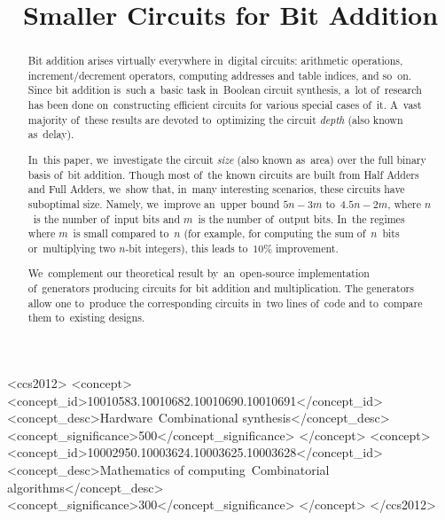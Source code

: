 \documentclass[sigconf, review, anonymous]{acmart}
\begin{document}
\begin{CCSXML}
	<ccs2012>
	<concept>
	<concept_id>10010583.10010682.10010690.10010691</concept_id>
	<concept_desc>Hardware~Combinational synthesis</concept_desc>
	<concept_significance>500</concept_significance>
	</concept>
	<concept>
	<concept_id>10002950.10003624.10003625.10003628</concept_id>
	<concept_desc>Mathematics of computing~Combinatorial algorithms</concept_desc>
	<concept_significance>300</concept_significance>
	</concept>
	</ccs2012>
\end{CCSXML}



\title{Smaller Circuits for Bit Addition}

\begin{abstract}
    Bit addition arises virtually everywhere in~digital circuits:
    arithmetic operations,
    increment/decrement operators,
    computing addresses and table indices, and so~on.
    Since bit addition is~such a~basic task in~Boolean circuit synthesis,
    a~lot of~research has been done on~constructing efficient circuits
    for various special cases of~it. A~vast majority of~these results are devoted to~optimizing the circuit \emph{depth} (also known as~delay).

    In~this paper, we~investigate the circuit \emph{size} (also known as~area)
    over the full binary basis of~bit addition. Though most of~the known circuits are built from Half Adders and Full Adders,
    we~show that, in~many interesting scenarios, these circuits have suboptimal size.
    Namely, we~improve an~upper bound $5n-3m$ to~$4.5n-2m$,
    where $n$~is the number of~input bits and $m$~is the number of~output bits.
    In~the regimes where $m$~is small compared to~$n$ 
    (for example, for computing the sum 
    of~$n$~bits or~multiplying two $n$-bit integers),
    this leads to~$10\%$ improvement.

    We~complement our theoretical result by~an~open-source implementation
    of~generators producing circuits for bit addition and multiplication.
    The generators allow one to~produce the corresponding circuits
    in~two lines of~code and to~compare them to~existing designs.
\end{abstract}
\end{document}
